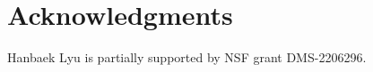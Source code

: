 \documentclass[11pt]{amsart}
\theoremstyle{plain}
\theoremstyle{definition}
\theoremstyle{remark}
\def\param{\boldsymbol{\theta}}
\begin{document}


\section*{Acknowledgments}
Hanbaek Lyu is partially supported by NSF grant DMS-2206296.



\end{document}
